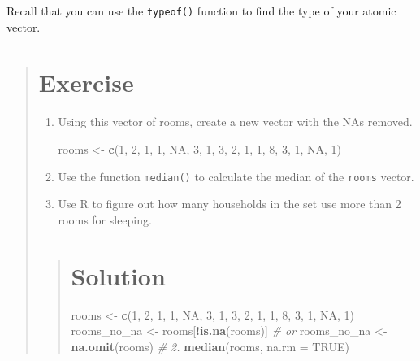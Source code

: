 \documentclass[]{book}
\newenvironment{Shaded}{\begin{snugshade}}{\end{snugshade}}
\newcommand{\KeywordTok}[1]{\textcolor[rgb]{0.13,0.29,0.53}{\textbf{#1}}}
\newcommand{\DataTypeTok}[1]{\textcolor[rgb]{0.13,0.29,0.53}{#1}}
\newcommand{\DecValTok}[1]{\textcolor[rgb]{0.00,0.00,0.81}{#1}}
\newcommand{\StringTok}[1]{\textcolor[rgb]{0.31,0.60,0.02}{#1}}
\newcommand{\CommentTok}[1]{\textcolor[rgb]{0.56,0.35,0.01}{\textit{#1}}}
\newcommand{\OtherTok}[1]{\textcolor[rgb]{0.56,0.35,0.01}{#1}}
\newcommand{\OperatorTok}[1]{\textcolor[rgb]{0.81,0.36,0.00}{\textbf{#1}}}
\newcommand{\NormalTok}[1]{#1}
\begin{document}
Recall that you can use the \texttt{typeof()} function to find the type
of your atomic vector.

\begin{quote}
\section{Exercise}\label{exercise-9}

\begin{enumerate}
\def\labelenumi{\arabic{enumi}.}
\item
  Using this vector of rooms, create a new vector with the NAs removed.

\begin{Shaded}
\begin{Highlighting}[]
\NormalTok{rooms <-}\StringTok{ }\KeywordTok{c}\NormalTok{(}\DecValTok{1}\NormalTok{, }\DecValTok{2}\NormalTok{, }\DecValTok{1}\NormalTok{, }\DecValTok{1}\NormalTok{, }\OtherTok{NA}\NormalTok{, }\DecValTok{3}\NormalTok{, }\DecValTok{1}\NormalTok{, }\DecValTok{3}\NormalTok{, }\DecValTok{2}\NormalTok{, }\DecValTok{1}\NormalTok{, }\DecValTok{1}\NormalTok{, }\DecValTok{8}\NormalTok{, }\DecValTok{3}\NormalTok{, }\DecValTok{1}\NormalTok{, }\OtherTok{NA}\NormalTok{, }\DecValTok{1}\NormalTok{)}
\end{Highlighting}
\end{Shaded}
\item
  Use the function \texttt{median()} to calculate the median of the
  \texttt{rooms} vector.
\item
  Use R to figure out how many households in the set use more than 2
  rooms for sleeping.
\end{enumerate}

\begin{quote}
\section{Solution}\label{solution-11}

\begin{Shaded}
\begin{Highlighting}[]
\NormalTok{rooms <-}\StringTok{ }\KeywordTok{c}\NormalTok{(}\DecValTok{1}\NormalTok{, }\DecValTok{2}\NormalTok{, }\DecValTok{1}\NormalTok{, }\DecValTok{1}\NormalTok{, }\OtherTok{NA}\NormalTok{, }\DecValTok{3}\NormalTok{, }\DecValTok{1}\NormalTok{, }\DecValTok{3}\NormalTok{, }\DecValTok{2}\NormalTok{, }\DecValTok{1}\NormalTok{, }\DecValTok{1}\NormalTok{, }\DecValTok{8}\NormalTok{, }\DecValTok{3}\NormalTok{, }\DecValTok{1}\NormalTok{, }\OtherTok{NA}\NormalTok{, }\DecValTok{1}\NormalTok{)}
\NormalTok{rooms_no_na <-}\StringTok{ }\NormalTok{rooms[}\OperatorTok{!}\KeywordTok{is.na}\NormalTok{(rooms)]}
\CommentTok{# or}
\NormalTok{rooms_no_na <-}\StringTok{ }\KeywordTok{na.omit}\NormalTok{(rooms)}
\CommentTok{# 2.}
\KeywordTok{median}\NormalTok{(rooms, }\DataTypeTok{na.rm =} \OtherTok{TRUE}\NormalTok{)}
\end{Highlighting}
\end{Shaded}


\end{quote}
\end{quote}
\end{document}
